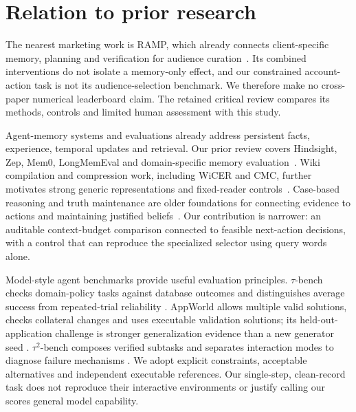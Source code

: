\section{Relation to prior research}
The nearest marketing work is RAMP, which already connects client-specific memory, planning and verification for audience curation~\citep{p250811120}. Its combined interventions do not isolate a memory-only effect, and our constrained account-action task is not its audience-selection benchmark. We therefore make no cross-paper numerical leaderboard claim. The retained critical review compares its methods, controls and limited human assessment with this study.

Agent-memory systems and evaluations already address persistent facts, experience, temporal updates and retrieval. Our prior review covers Hindsight, Zep, Mem0, LongMemEval and domain-specific memory evaluation~\citep{p251212818,p250113956,p250419413,p241010813,p260726072}. Wiki compilation and compression work, including WiCER and CMC, further motivates strong generic representations and fixed-reader controls~\citep{p260507068,p260932658}. Case-based reasoning and truth maintenance are older foundations for connecting evidence to actions and maintaining justified beliefs~\citep{aamodt1994,doyle1979}. Our contribution is narrower: an auditable context-budget comparison connected to feasible next-action decisions, with a control that can reproduce the specialized selector using query words alone.

Model-style agent benchmarks provide useful evaluation principles. $\tau$-bench checks domain-policy tasks against database outcomes and distinguishes average success from repeated-trial reliability \citep{taubench2024}. AppWorld allows multiple valid solutions, checks collateral changes and uses executable validation solutions; its held-out-application challenge is stronger generalization evidence than a new generator seed \citep{appworld2024}. $\tau^2$-bench composes verified subtasks and separates interaction modes to diagnose failure mechanisms \citep{tau2bench2025}. We adopt explicit constraints, acceptable alternatives and independent executable references. Our single-step, clean-record task does not reproduce their interactive environments or justify calling our scores general model capability.
